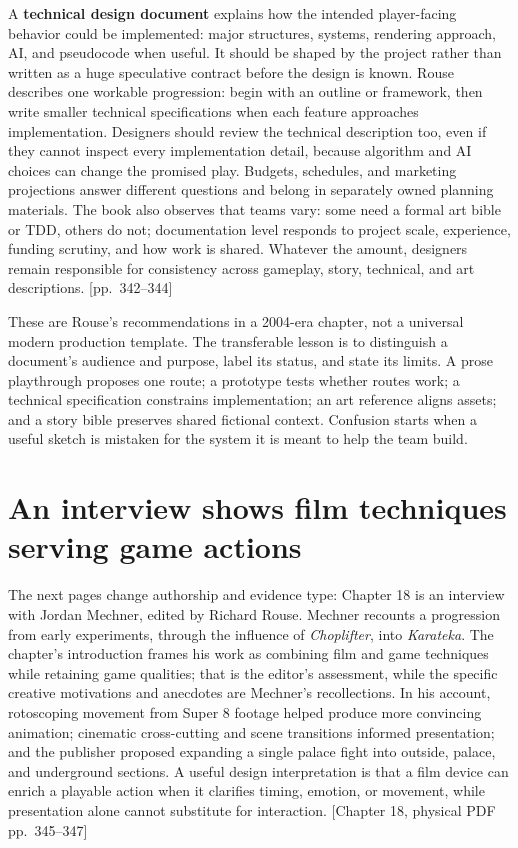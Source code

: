 A \textbf{technical design document} explains how the intended player-facing behavior could be implemented: major structures, systems, rendering approach, AI, and pseudocode when useful. It should be shaped by the project rather than written as a huge speculative contract before the design is known. Rouse describes one workable progression: begin with an outline or framework, then write smaller technical specifications when each feature approaches implementation. Designers should review the technical description too, even if they cannot inspect every implementation detail, because algorithm and AI choices can change the promised play. Budgets, schedules, and marketing projections answer different questions and belong in separately owned planning materials. The book also observes that teams vary: some need a formal art bible or TDD, others do not; documentation level responds to project scale, experience, funding scrutiny, and how work is shared. Whatever the amount, designers remain responsible for consistency across gameplay, story, technical, and art descriptions. {[}pp.~342--344{]}

These are Rouse's recommendations in a 2004-era chapter, not a universal modern production template. The transferable lesson is to distinguish a document's audience and purpose, label its status, and state its limits. A prose playthrough proposes one route; a prototype tests whether routes work; a technical specification constrains implementation; an art reference aligns assets; and a story bible preserves shared fictional context. Confusion starts when a useful sketch is mistaken for the system it is meant to help the team build.

\section{An interview shows film techniques serving game actions}\label{06-engine-ii-ch046-an-interview-shows-film-techniques-serving-game-actions}

\hypertarget{06-engine-ii-ch046-an-interview-shows-film-techniques-serving-game-actions}{}

The next pages change authorship and evidence type: Chapter 18 is an interview with Jordan Mechner, edited by Richard Rouse. Mechner recounts a progression from early experiments, through the influence of \emph{Choplifter}, into \emph{Karateka}. The chapter's introduction frames his work as combining film and game techniques while retaining game qualities; that is the editor's assessment, while the specific creative motivations and anecdotes are Mechner's recollections. In his account, rotoscoping movement from Super 8 footage helped produce more convincing animation; cinematic cross-cutting and scene transitions informed presentation; and the publisher proposed expanding a single palace fight into outside, palace, and underground sections. A useful design interpretation is that a film device can enrich a playable action when it clarifies timing, emotion, or movement, while presentation alone cannot substitute for interaction. {[}Chapter 18, physical PDF pp.~345--347{]}

